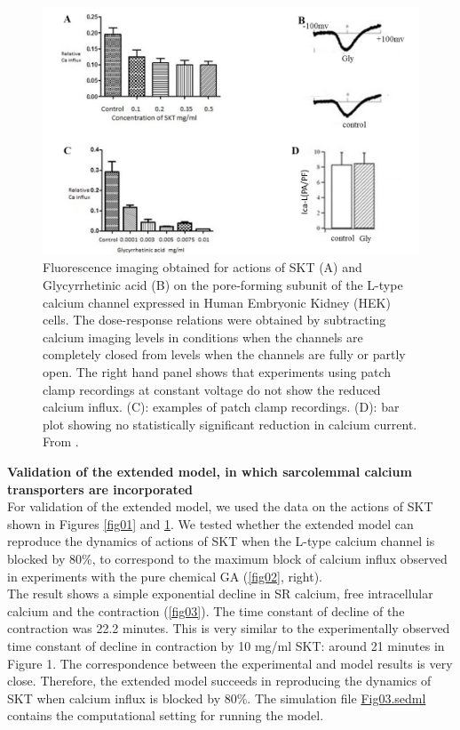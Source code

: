 \documentclass[fleqn,10pt]{physiome}
\begin{document}
\begin{figure}[h!]
\centering
\includegraphics[width=0.8\linewidth]{figure02}
\caption{Fluorescence imaging obtained for actions of SKT (A) and Glycyrrhetinic acid (B) on the pore-forming subunit of the L-type calcium channel expressed in Human Embryonic Kidney (HEK) cells. The dose-response relations were obtained by subtracting calcium imaging levels in conditions when the channels are completely closed from levels when the channels are fully or partly open. The right hand panel shows that experiments using patch clamp recordings at constant voltage do not show the reduced calcium influx. (C): examples of patch clamp recordings. (D): bar plot showing no statistically significant reduction in calcium current. From \citep{noble2016action}.}
\label{fig02}
\end{figure}

\textbf{Validation of the extended model, in which sarcolemmal calcium transporters are incorporated}\\\newline
For validation of the extended model, we used the data on the actions of SKT shown in Figures \ref{fig01} and \ref{fig02}. We tested whether the extended model can reproduce the dynamics of actions of SKT when the L-type calcium channel is blocked by 80\%, to correspond to the maximum block of calcium influx observed in experiments with the pure chemical GA (\autoref{fig02}, right).\\\newpage
The result shows a simple exponential decline in SR calcium, free intracellular calcium and the contraction (\autoref{fig03}). The time constant of decline of the contraction was 22.2 minutes. This is very similar to the experimentally observed time constant of decline in contraction by 10 mg/ml SKT: around 21 minutes in Figure 1. The correspondence between the experimental and model results is very close. Therefore, the extended model succeeds in reproducing the dynamics of SKT when calcium influx is blocked by 80\%. 
The simulation file \href{http://models.cellml.org/workspace/5f4/file/2807f4098d7bfb04507e1d2f876e30aa001e8ead/Fig03.sedml}{Fig03.sedml} contains the computational setting for running the model.
\newline
\end{document}
